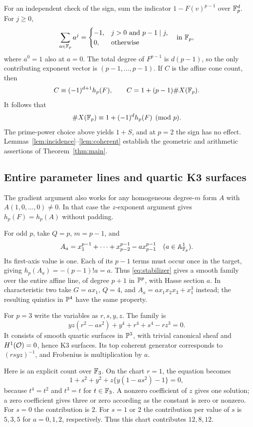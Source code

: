 For an independent check of the sign, sum the indicator $1-F(v)^{p-1}$ over $\mathbb F_p^d$. For $j\ge0$,
\[
\sum_{a\in\mathbb F_p}a^j=
\begin{cases}-1,&j>0\text{ and }p-1\mid j,\\0,&\text{otherwise}\end{cases}
\quad\text{in }\mathbb F_p,
\]
where $a^0=1$ also at $a=0$. The total degree of $F^{p-1}$ is $d(p-1)$, so the only contributing exponent vector is $(p-1,\ldots,p-1)$. If $C$ is the affine cone count, then
\[
C\equiv(-1)^{d+1}h_p(F),\qquad
C=1+(p-1)\#X(\mathbb F_p).
\]
It follows that
\begin{equation}\label{eq:point-sign}
\#X(\mathbb F_p)\equiv1+(-1)^d h_p(F)\pmod p.
\end{equation}
The prime-power choice above yields $1+S$, and at $p=2$ the sign has no effect. Lemmas~\ref{lem:incidence}--\ref{lem:coherent} establish the geometric and arithmetic assertions of Theorem~\ref{thm:main}.

\subsection{Entire parameter lines and quartic K3 surfaces}
\label{sec:entire-lines}
The gradient argument also works for any homogeneous degree-$m$ form $A$ with $A(1,0,\ldots,0)\ne0$. In that case the $z$-exponent argument gives $h_p(F)=h_p(A)$ without padding.

For odd $p$, take $Q=p$, $m=p-1$, and
\[
A_a=x_1^{p-1}+\cdots+x_{p-2}^{p-1}-a x_{p-1}^{p-1}
\quad(a\in\mathbb A^1_{\mathbb F_p}).
\]
Its first-axis value is one. Each of its $p-1$ terms must occur once in the target, giving $h_p(A_a)=-(p-1)!a=a$. Thus \eqref{eq:stabilizer} gives a smooth family over the entire affine line, of degree $p+1$ in $\mathbb P^p$, with Hasse section $a$. In characteristic two take $G=ax_1$, $Q=4$, and $A_a=ax_1x_2x_3+x_1^3$ instead; the resulting quintics in $\mathbb P^4$ have the same property.

For $p=3$ write the variables as $r,s,y,z$. The family is
\begin{equation}\label{eq:k3}
yz(r^2-a s^2)+y^4+r^4+s^4-rz^3=0.
\end{equation}
It consists of smooth quartic surfaces in $\mathbb P^3$, with trivial canonical sheaf and $H^1(\mathcal O)=0$, hence K3 surfaces. Its top coherent generator corresponds to $(rsyz)^{-1}$, and Frobenius is multiplication by $a$.

Here is an explicit count over $\mathbb F_3$. On the chart $r=1$, the equation becomes
\[
1+s^2+y^2+z\{y(1-a s^2)-1\}=0,
\]
because $t^4=t^2$ and $t^3=t$ for $t\in\mathbb F_3$. A nonzero coefficient of $z$ gives one solution; a zero coefficient gives three or zero according as the constant is zero or nonzero. For $s=0$ the contribution is $2$. For $s=1$ or $2$ the contribution per value of $s$ is $5,3,5$ for $a=0,1,2$, respectively. Thus this chart contributes $12,8,12$.

